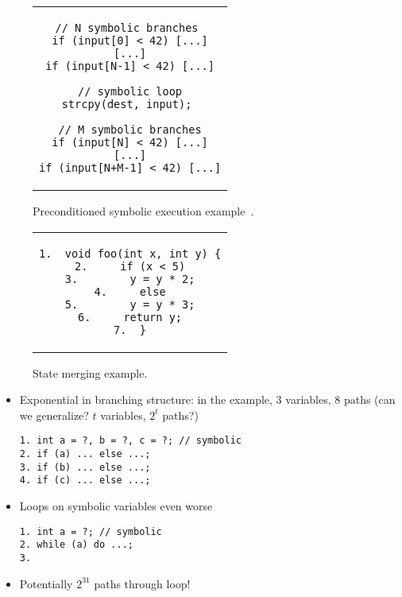 
\begin{figure}[t]
\begin{small}
\begin{center}
\begin{tabular}{c}
\begin{lstlisting}[basicstyle=\ttfamily\small]
// N symbolic branches 
if (input[0] < 42) [...]
[...]
if (input[N-1] < 42) [...]

// symbolic loop
strcpy(dest, input); 

// M symbolic branches
if (input[N] < 42) [...]
[...]
if (input[N+M-1] < 42) [...]
\end{lstlisting}
\end{tabular}
\end{center}
\end{small}
\caption{\label{fig:preconditioned} Preconditioned symbolic execution example~\protect\cite{AEG-NDSS11}.}
\end{figure}

\begin{figure}[t]
\begin{center}
\begin{tabular}{c}
\begin{lstlisting}[basicstyle=\ttfamily\small]
1.  void foo(int x, int y) {
2.     if (x < 5)
3.        y = y * 2;
4.     else
5.        y = y * 3;
6.     return y;
7.  }
\end{lstlisting}
\end{tabular}
\end{center}
\caption{State merging example.}
\label{fi:example-state-merging}
\end{figure}



\begin{itemize}

\item Exponential in branching structure: in the example, 3 variables, 8 paths (can we generalize? $t$ variables, $2^t$ paths?)

\begin{verbatim}
1. int a = ?, b = ?, c = ?; // symbolic
2. if (a) ... else ...;
3. if (b) ... else ...;
4. if (c) ... else ...;
\end{verbatim}

\item Loops on symbolic variables even worse

\begin{verbatim}
1. int a = ?; // symbolic
2. while (a) do ...;
3.
\end{verbatim}
\item Potentially $2^{31}$ paths through loop!

\end{itemize}



